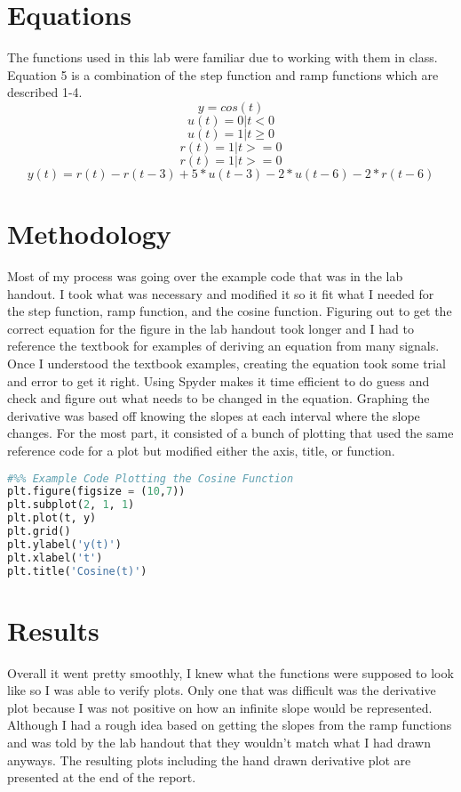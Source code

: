 \documentclass[12pt]{report}
\begin{document}
\section{Equations}
The functions used in this lab were familiar due to working with them in class. Equation 5 is a combination of
the step function and ramp functions which are described 1-4. 
\begin{equation*}
y = cos(t)
\end{equation*}
\begin{equation}
u(t) = 0 | t < 0
\end{equation}
\begin{equation}
u(t) = 1 | t \geq 0
\end{equation}
\begin{equation}
r(t) = 1 | t >= 0
\end{equation}
\begin{equation}
r(t) = 1 | t >= 0
\end{equation}
\begin{equation}
    y (t)=  r(t) - r(t - 3) + 5 * u(t- 3) - 2 * u(t - 6) - 2 * r(t - 6) 
\end{equation}
\section{Methodology}
Most of my process was going over the example code that was in the lab handout. I took what was necessary
and modified it so it fit what I needed for the step function, ramp function, and the cosine function. Figuring out 
to get the correct equation for the figure in the lab handout took longer and I had to reference the textbook for examples
of deriving an equation from many signals. Once I understood the textbook examples, creating the equation took some trial and 
error to get it right. Using Spyder makes it time efficient to do guess and check and figure out what needs to be changed in the 
equation. Graphing the derivative was based off knowing the slopes at each interval where the slope changes. For the most part, it
consisted of a bunch of plotting that used the same reference code for a plot but modified either the axis, title, or function. 
\begin{lstlisting}[language=Python]
#%% Example Code Plotting the Cosine Function
plt.figure(figsize = (10,7))
plt.subplot(2, 1, 1)
plt.plot(t, y)
plt.grid()
plt.ylabel('y(t)')
plt.xlabel('t')
plt.title('Cosine(t)')
\end{lstlisting}
\section{Results}
Overall it went pretty smoothly, I knew what the functions were supposed to look like
so I was able to verify plots. Only one that was difficult was the derivative plot 
because I was not positive on how an infinite slope would be represented. Although I had 
a rough idea based on getting the slopes from the ramp functions and was told by the lab
handout that they wouldn't match what I had drawn anyways. The resulting plots including the hand drawn derivative plot
are presented at the end of the report.
\end{document}
